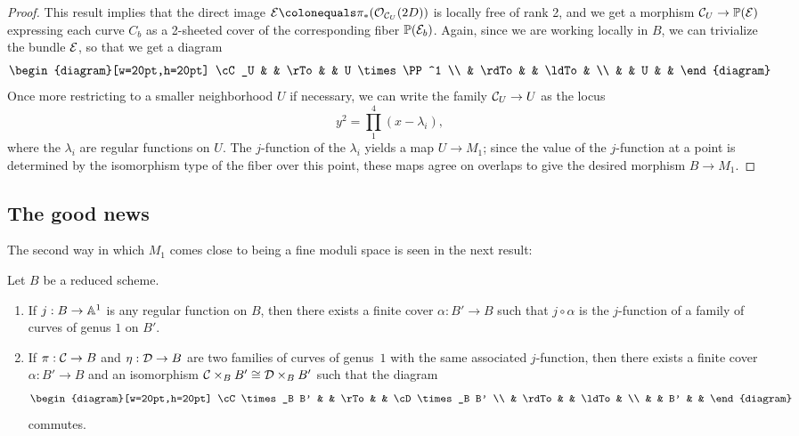\begin{proof}
This result implies that the direct image $\cE \colonequals  \pi_*(\cO_{\cC_U}(2D))$ is locally free of rank 2, and we get a morphism $\cC_U \to \PP(\cE)$ expressing each curve $C_b$ as a 2-sheeted cover of the corresponding fiber $\PP(\cE_b)$. Again, since we are working locally in $B$, we can trivialize the bundle $\cE$, so that we get a diagram
$$
\begin{diagram}[w=20pt,h=20pt]
\cC_U & & \rTo & & U \times \PP^1 \\
& \rdTo & & \ldTo & \\
& & U & &
\end{diagram}
\vspace*{3pt}
$$
Once more restricting to a smaller neighborhood $U$ if necessary, we can write the family $\cC_U \to U$ as the locus
\vspace*{-3pt}
$$
y^2 = \prod_1^4 (x - \lambda_i),
$$
where the $\lambda_i$ are regular functions on $U$. The $j$-function of the $\lambda_i$  yields a map $U \to M_1$; since the value of the $j$-function at a point is determined by the isomorphism type of the fiber over this point, these maps agree on overlaps to give  the desired morphism $B \to M_1$.
\end{proof}



\subsection*{The good news}

The second way in which
$M_1$ comes close to being a fine moduli space
is seen in the next result:

\begin{proposition}\label{families on pullbacks} Let $B$ be a reduced scheme.
\begin{enumerate}
\item If $j : B \to \AA^1$ is any regular function on $B$, then there
  exists a finite cover $\alpha : B' \to B$ such that $j \circ \alpha$
  is the $j$-function of a family of curves of genus $1$ on $B'$.
\item If $\pi : \cC \to B$ and $\eta : \cD \to B$ are two families of
  curves of genus~$1$ with the same associated $j$-function, then there
  exists a finite cover $\alpha : B' \to B$ and an isomorphism $\cC
  \times_B B' \cong \cD \times_B B'$ such that the diagram
$$
\begin{diagram}[w=20pt,h=20pt]
\cC \times_B B' & & \rTo & & \cD \times_B B' \\
& \rdTo & & \ldTo & \\
& & B' & &
\end{diagram}
$$
commutes.
\end{enumerate}
\end{proposition}

